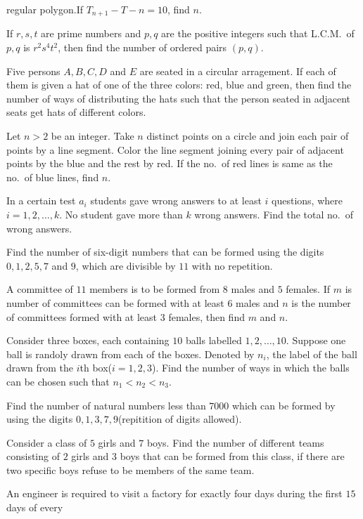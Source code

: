   regular polygon.If $T_{n + 1} - T-n = 10$, find $n$.
\item If $r, s, t$ are prime numbers and $p, q$ are the positive integers such that L.C.M.\ of $p, q$ is
  $r^2s^4t^2$, then find the number of ordered pairs $(p, q)$.
\item Five persons $A, B, C, D$ and $E$ are seated in a circular arragement. If each of them is given a hat
  of one of the three colors: red, blue and green, then find the number of ways of distributing the hats
  such that the person seated in adjacent seats get hats of different colors.
\item Let $n > 2$ be an integer. Take $n$ distinct points on a circle and join each pair of points by a line
  segment. Color the line segment joining every pair of adjacent points by the blue and the rest by red. If
  the no.\ of red lines is same as the no.\ of blue lines, find $n$.
\item In a certain test $a_i$ students gave wrong answers to at least $i$ questions, where $i = 1,
  2, \ldots, k$. No student gave more than $k$ wrong answers. Find the total no.\ of wrong answers.
\item Find the number of six-digit numbers that can be formed using the digits $0, 1, 2, 5, 7$ and $9$,
  which are divisible by $11$ with no repetition.
\item A committee of $11$ members is to be formed from $8$ males and $5$ females. If $m$ is number of
  committees can be formed with at least $6$ males and $n$ is the number of committees formed with at least
  $3$ females, then find $m$ and $n$.
\item Consider three boxes, each containing $10$ balls labelled $1, 2, \ldots, 10$. Suppose one ball is
  randoly drawn  from each of the boxes. Denoted by $n_i$, the label of the ball drawn from the $i$th box($i
  = 1, 2, 3$). Find the number of ways in which the balls can be chosen such that $n_1 < n_2 < n_3$.
\item Find the number of natural numbers less than $7000$ which can be formed by using the digits $0, 1, 3,
  7, 9$(repitition of digits allowed).
\item Consider a class of $5$ girls and $7$ boys. Find the number of different teams consisting of $2$ girls
  and $3$ boys that can be formed from this class, if there are two specific boys refuse to be members of
  the same team.
\item An engineer is required to visit a factory for exactly four days during the first $15$ days of every
